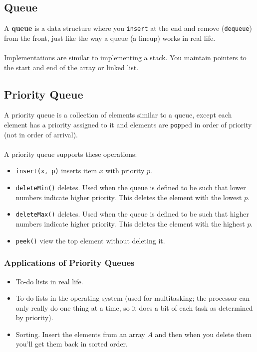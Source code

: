 \documentclass[]{article}
\theoremstyle{definition}
\newcommand{\lecture}[1]{\marginpar{{\footnotesize $\leftarrow$ \underline{#1}}}}
\begin{document}
		\subsection{Queue}
			A \textbf{queue} is a data structure where you \verb+insert+ at the end and remove (\verb+dequeue+) from the front, just like the way a queue (a lineup) works in real life. 
			\\ \\
			Implementations are similar to implementing a stack. You maintain pointers to the start and end of the array or linked list.
		\subsection{Priority Queue} \lecture{January 22, 2013}
			A priority queue is a collection of elements similar to a queue, except each element has a priority assigned to it and elements are \verb+pop+ped in order of priority (not in order of arrival).
			\\ \\
			A priority queue supports these operations:
			\begin{itemize}
				\item \verb+insert(x, p)+ \textendash{} inserts item $x$ with priority $p$.
				\item \verb+deleteMin()+ \textendash{} deletes. Used when the queue is defined to be such that lower numbers indicate higher priority. This deletes the element with the lowest $p$.
				\item \verb+deleteMax()+ \textendash{} deletes. Used when the queue is defined to be such that higher numbers indicate higher priority. This deletes the element with the highest $p$.
				\item \verb+peek()+ \textendash{} view the top element without deleting it.
			\end{itemize}

			\subsubsection{Applications of Priority Queues}
				\begin{itemize}
					\item To-do lists in real life.
					\item To-do lists in the operating system (used for multitasking; the processor can only really do one thing at a time, so it does a bit of each task as determined by priority).
					\item Sorting. Insert the elements from an array $A$ and then when you delete them you'll get them back in sorted order.
				\end{itemize}
				
\end{document}
